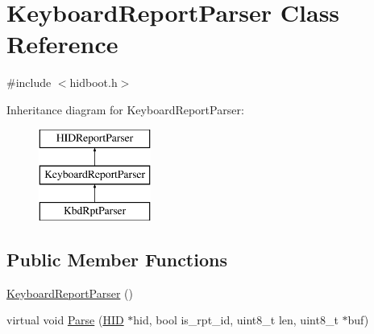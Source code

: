 \hypertarget{class_keyboard_report_parser}{\section{\-Keyboard\-Report\-Parser \-Class \-Reference}
\label{class_keyboard_report_parser}
}


{\ttfamily \#include $<$hidboot.\-h$>$}

\-Inheritance diagram for \-Keyboard\-Report\-Parser\-:\begin{figure}[H]
\begin{center}
\leavevmode
\includegraphics[height=3.000000cm]{class_keyboard_report_parser}
\end{center}
\end{figure}
\subsection*{\-Public \-Member \-Functions}
\begin{DoxyCompactItemize}
\item 
\hyperlink{class_keyboard_report_parser_aa9b5c7b50c3d2b920060b15e7a5133f9}{\-Keyboard\-Report\-Parser} ()
\item 
virtual void \hyperlink{class_keyboard_report_parser_a60d8d4d4d187ce5c0e0d69aee7cc772f}{\-Parse} (\hyperlink{class_h_i_d}{\-H\-I\-D} $\ast$hid, bool is\-\_\-rpt\-\_\-id, uint8\-\_\-t len, uint8\-\_\-t $\ast$buf)
\end{DoxyCompactItemize}
